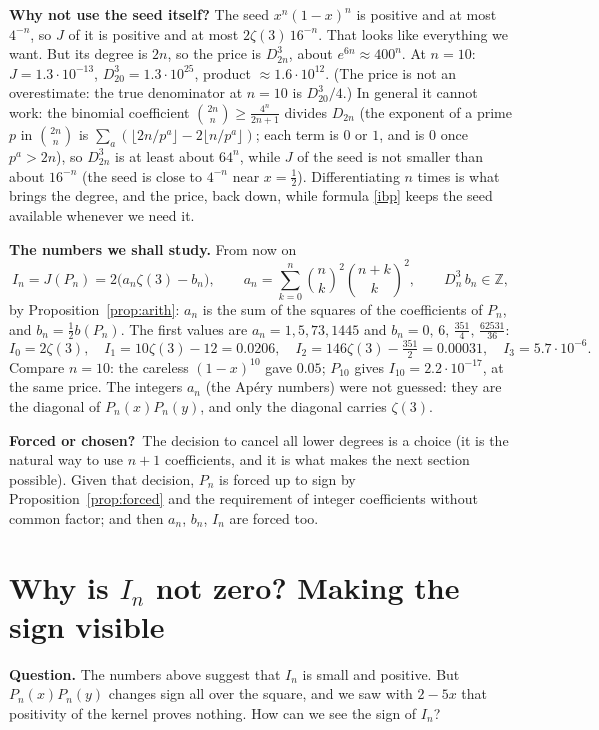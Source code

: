 \documentclass[11pt]{article}
\newcommand{\Z}{\mathbb Z}
\theoremstyle{remark}
\newcommand{\q}[1]{\medskip\noindent\textbf{#1}}
\newcommand{\forced}{\medskip\noindent\textbf{Forced or chosen?}\ }
\begin{document}
\q{Why not use the seed itself?} The seed $x^n(1-x)^n$ is positive and at most $4^{-n}$, so
$J$ of it is positive and at most $2\zeta(3)\,16^{-n}$. That looks like everything we want. But
its degree is $2n$, so the price is $D_{2n}^3$, about $e^{6n}\approx400^n$. At $n=10$:
$J=1.3\cdot10^{-13}$, $D_{20}^3=1.3\cdot10^{25}$, product $\approx1.6\cdot10^{12}$. (The price is not an overestimate: the true denominator at
$n=10$ is $D_{20}^3/4$.) In general it cannot work: the binomial coefficient
$\binom{2n}n\ge\frac{4^n}{2n+1}$ divides $D_{2n}$ (the exponent of a prime $p$ in $\binom{2n}n$ is
$\sum_a(\lfloor2n/p^a\rfloor-2\lfloor n/p^a\rfloor)$; each term is $0$ or $1$, and is $0$ once
$p^a>2n$), so $D_{2n}^3$ is at least about $64^n$, while $J$ of the seed is not smaller than about
$16^{-n}$ (the seed is close to $4^{-n}$ near $x=\frac12$). Differentiating $n$ times is what brings the degree, and the price,
back down, while formula \eqref{ibp} keeps the seed available whenever we need it.

\q{The numbers we shall study.} From now on
\[
I_n=J(P_n)=2\bigl(a_n\zeta(3)-b_n\bigr),\qquad
a_n=\sum_{k=0}^n\binom nk^2\binom{n+k}k^2,\qquad D_n^3\,b_n\in\Z,
\]
by Proposition~\ref{prop:arith}: $a_n$ is the sum of the squares of the coefficients of $P_n$, and
$b_n=\frac12b(P_n)$. The first values are $a_n=1,5,73,1445$ and
$b_n=0,\,6,\,\frac{351}4,\,\frac{62531}{36}$:
\[
I_0=2\zeta(3),\quad I_1=10\zeta(3)-12=0.0206,\quad I_2=146\zeta(3)-\tfrac{351}2=0.00031,\quad
I_3=5.7\cdot10^{-6}.
\]
Compare $n=10$: the careless $(1-x)^{10}$ gave $0.05$; $P_{10}$ gives $I_{10}=2.2\cdot10^{-17}$,
at the same price. The integers $a_n$ (the Ap\'ery numbers) were not guessed: they are the
diagonal of $P_n(x)P_n(y)$, and only the diagonal carries $\zeta(3)$.

\forced The decision to cancel all lower degrees is a choice (it is the natural way to use
$n+1$ coefficients, and it is what makes the next section possible). Given that decision, $P_n$
is forced up to sign by Proposition~\ref{prop:forced} and the requirement of integer coefficients
without common factor; and then $a_n$, $b_n$, $I_n$ are forced too.

\section{Why is $I_n$ not zero? Making the sign visible}

\q{Question.} The numbers above suggest that $I_n$ is small and positive. But $P_n(x)P_n(y)$
changes sign all over the square, and we saw with $2-5x$ that positivity of the kernel proves
nothing. How can we see the sign of $I_n$?
\end{document}
